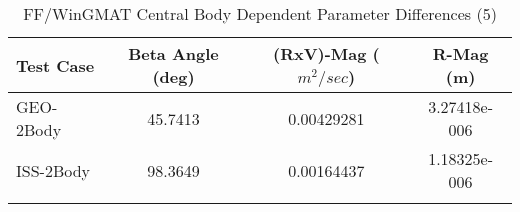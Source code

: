 \begin{table}[htbp!]
\centering
\caption{ FF/WinGMAT Central Body Dependent Parameter Differences (5)}
      \begin{tabular}{lccc}
      \hline\hline
          Test Case & Beta Angle (deg) & (RxV)-Mag ($m^2/sec$) & R-Mag (m) \\
         \hline
         GEO-2Body & 45.7413 & 0.00429281 & 3.27418e-006 \\
         ISS-2Body & 98.3649 & 0.00164437 & 1.18325e-006 \\
      \hline\hline
      \label{Table: FF-WinGMAT CB Parameters Set 5} 
\end{tabular}
\end{table}
